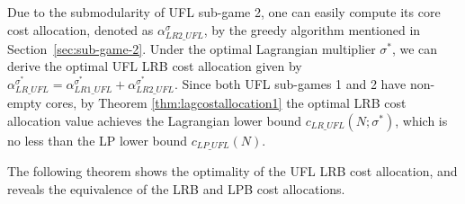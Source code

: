 \documentclass[ijoc,nonblindrev]{informs3} %
\begin{document}
Due to the submodularity of UFL sub-game 2, one can easily compute its core cost allocation, denoted as $\alpha_{LR2\_UFL}^{\sigma}$, by the greedy algorithm mentioned in Section~\ref{sec:sub-game-2}. Under the optimal Lagrangian multiplier $\sigma^*$, we can derive the optimal UFL LRB cost allocation given by $\alpha_{LR\_UFL}^{\sigma^*} = \alpha_{LR1\_UFL}^{\sigma^*} + \alpha_{LR2\_UFL}^{\sigma^*}$. 
Since both UFL sub-games 1 and 2 have non-empty cores, by Theorem \ref{thm:lagcostallocation1} the optimal LRB cost allocation value achieves the Lagrangian lower bound $c_{LR\_UFL}(N;\sigma^*)$, 
which is no less than the LP lower bound $c_{LP\_UFL}(N)$.



The following theorem shows the optimality of the UFL LRB cost allocation, and reveals the equivalence of the LRB and LPB cost allocations. %
\end{document}
